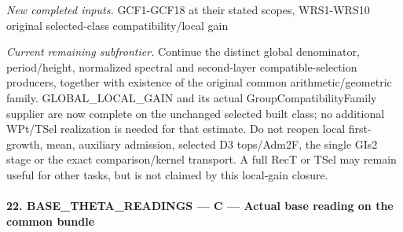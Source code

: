 \documentclass[11pt,a4paper]{article}
\numberwithin{equation}{section}
\theoremstyle{remark}\newtheorem{remark}[theorem]{Remark}
\begin{document}
\emph{New completed inputs.} GCF1-GCF18 at their stated scopes, WRS1-WRS10 original selected-class compatibility/local gain

\emph{Current remaining subfrontier.} Continue the distinct global denominator, period/height, normalized spectral and second-layer compatible-selection producers, together with existence of the original common arithmetic/geometric family. GLOBAL\_\allowbreak LOCAL\_\allowbreak GAIN and its actual GroupCompatibilityFamily supplier are now complete on the unchanged selected built class; no additional WPt/TSel realization is needed for that estimate. Do not reopen local first-growth, mean, auxiliary admission, selected D3 tops/Adm2F, the single GIs2 stage or the exact comparison/kernel transport. A full RecT or TSel may remain useful for other tasks, but is not claimed by this local-gain closure.



\paragraph{22. BASE\_\allowbreak THETA\_\allowbreak READINGS — C — Actual base reading on the common bundle}
\end{document}
